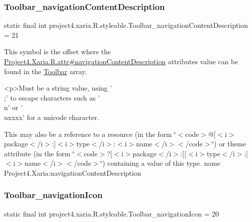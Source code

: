 \subsubsection{\texorpdfstring{Toolbar\+\_\+navigation\+Content\+Description}{Toolbar\_navigationContentDescription}}
{\footnotesize\ttfamily static final int project4.\+xaria.\+R.\+styleable.\+Toolbar\+\_\+navigation\+Content\+Description = 21\hspace{0.3cm}{\ttfamily [static]}}

This symbol is the offset where the \hyperlink{}{Project4.\+Xaria.\+R.\+attr\#navigation\+Content\+Description} attribute\textquotesingle{}s value can be found in the \hyperlink{classproject4_1_1xaria_1_1R_1_1styleable_af6c30f9e9e086f6bf4e510669443fa59}{Toolbar} array.

\begin{DoxyVerb}      <p>Must be a string value, using '\\;' to escape characters such as '\\n' or '\\uxxxx' for a unicode character.
\end{DoxyVerb}
 

This may also be a reference to a resource (in the form \char`\"{}$<$code$>$@\mbox{[}$<$i$>$package$<$/i$>$\+:\mbox{]}$<$i$>$type$<$/i$>$\+:$<$i$>$name$<$/i$>$$<$/code$>$\char`\"{}) or theme attribute (in the form \char`\"{}$<$code$>$?\mbox{[}$<$i$>$package$<$/i$>$\+:\mbox{]}\mbox{[}$<$i$>$type$<$/i$>$\+:\mbox{]}$<$i$>$name$<$/i$>$$<$/code$>$\char`\"{}) containing a value of this type.  name Project4.\+Xaria\+:navigation\+Content\+Description \mbox{\label{classproject4_1_1xaria_1_1R_1_1styleable_a857db4b68c78808f5d7aff17e497b305}} 
\subsubsection{\texorpdfstring{Toolbar\+\_\+navigation\+Icon}{Toolbar\_navigationIcon}}
{\footnotesize\ttfamily static final int project4.\+xaria.\+R.\+styleable.\+Toolbar\+\_\+navigation\+Icon = 20\hspace{0.3cm}{\ttfamily [static]}}

